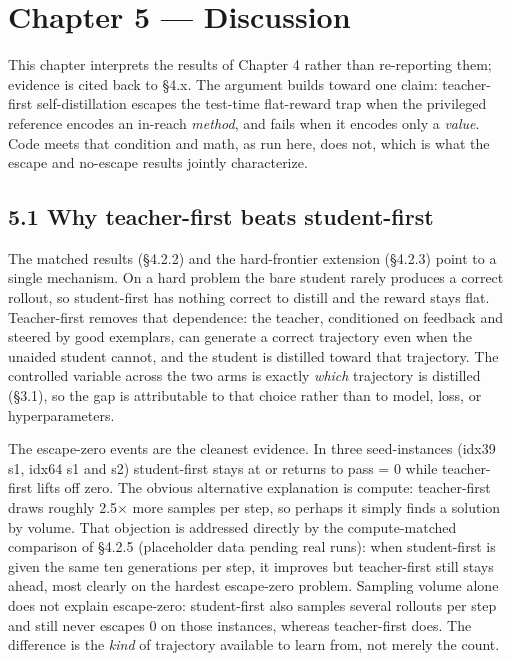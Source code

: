 \chapter{Chapter 5 --- Discussion}\label{chapter-5-discussion}

This chapter interprets the results of Chapter 4 rather than re-reporting them; evidence is cited back to §4.x. The argument builds toward one claim: teacher-first self-distillation escapes the test-time flat-reward trap when the privileged reference encodes an in-reach \emph{method}, and fails when it encodes only a \emph{value}. Code meets that condition and math, as run here, does not, which is what the escape and no-escape results jointly characterize.

\section{5.1 Why teacher-first beats student-first}\label{why-teacher-first-beats-student-first}

The matched results (§4.2.2) and the hard-frontier extension (§4.2.3) point to a single mechanism. On a hard problem the bare student rarely produces a correct rollout, so student-first has nothing correct to distill and the reward stays flat. Teacher-first removes that dependence: the teacher, conditioned on feedback and steered by good exemplars, can generate a correct trajectory even when the unaided student cannot, and the student is distilled toward that trajectory. The controlled variable across the two arms is exactly \emph{which} trajectory is distilled (§3.1), so the gap is attributable to that choice rather than to model, loss, or hyperparameters.

The escape-zero events are the cleanest evidence. In three seed-instances (idx39 s1, idx64 s1 and s2) student-first stays at or returns to pass = 0 while teacher-first lifts off zero. The obvious alternative explanation is compute: teacher-first draws roughly 2.5× more samples per step, so perhaps it simply finds a solution by volume. That objection is addressed directly by the compute-matched comparison of §4.2.5 (placeholder data pending real runs): when student-first is given the same ten generations per step, it improves but teacher-first still stays ahead, most clearly on the hardest escape-zero problem. Sampling volume alone does not explain escape-zero: student-first also samples several rollouts per step and still never escapes 0 on those instances, whereas teacher-first does. The difference is the \emph{kind} of trajectory available to learn from, not merely the count.

